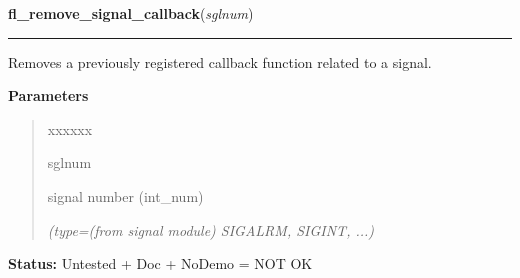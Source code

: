 \hspace{.8\funcindent}\begin{boxedminipage}{\funcwidth}

    \raggedright \textbf{fl\_remove\_signal\_callback}(\textit{sglnum})

    \vspace{-1.5ex}

    \rule{\textwidth}{0.5\fboxrule}
\setlength{\parskip}{2ex}
    Removes a previously registered callback function related to a signal.

\setlength{\parskip}{1ex}
      \textbf{Parameters}
      \vspace{-1ex}

      \begin{quote}
        \begin{Ventry}{xxxxxx}

          \item[sglnum]

          signal number (int\_num)

            {\it (type=(from signal module) SIGALRM, SIGINT, ...)}

        \end{Ventry}

      \end{quote}

\textbf{Status:} Untested + Doc + NoDemo = NOT OK



    \end{boxedminipage}

    \label{xformslib:library:fl_signal_caught}

    \vspace{0.5ex}

